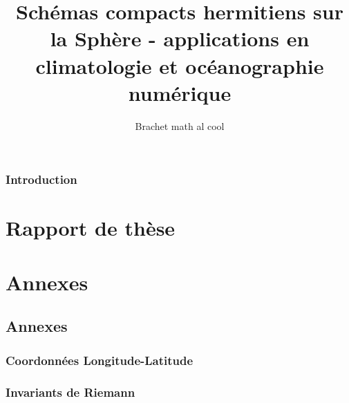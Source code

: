\documentclass[10pt,a4paper]{book}
\author{Brachet math al cool}
\title{Schémas compacts hermitiens sur la Sphère - applications en climatologie et océanographie numérique}
\begin{document}
\maketitle
\newpage
\tableofcontents
\listoffigures
\listoftables

\newpage

\section*{Introduction}
%

\part{Rapport de thèse}










\part{Annexes}

\chapter{Annexes}
\section{Coordonnées Longitude-Latitude}

\section{Invariants de Riemann}


%



\end{document}
